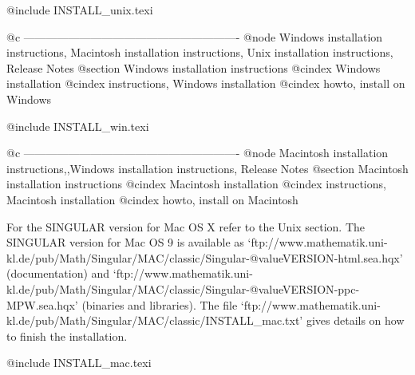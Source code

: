 @include INSTALL_unix.texi

@c ----------------------------------------------------------
@node Windows installation instructions, Macintosh installation instructions, Unix installation instructions, Release Notes
@section Windows installation instructions
@cindex Windows installation
@cindex instructions, Windows installation
@cindex howto, install on Windows

@include INSTALL_win.texi

@c ----------------------------------------------------------
@node Macintosh installation instructions,,Windows installation instructions, Release Notes
@section Macintosh installation instructions
@cindex Macintosh installation
@cindex instructions, Macintosh installation
@cindex howto, install on Macintosh

For the SINGULAR version for Mac OS X refer to the Unix section.
The SINGULAR version for Mac OS 9 is available as
`ftp://www.mathematik.uni-kl.de/pub/Math/Singular/MAC/classic/Singular-@value{VERSION}-html.sea.hqx'
(documentation) and
`ftp://www.mathematik.uni-kl.de/pub/Math/Singular/MAC/classic/Singular-@value{VERSION}-ppc-MPW.sea.hqx'
(binaries and libraries).  The file
`ftp://www.mathematik.uni-kl.de/pub/Math/Singular/MAC/classic/INSTALL_mac.txt'
gives details on how to finish the installation.

@include INSTALL_mac.texi

